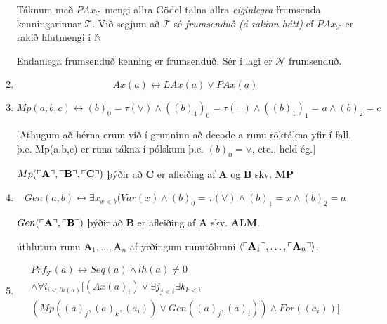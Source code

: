 \documentclass[12pt]{book}
\newcommand{\cT}{\mathcal{T}}
\newcommand{\cN}{\mathcal{N}}
\newcommand{\bA}{\mathbf{A}}
\newcommand{\bB}{\mathbf{B}}
\newcommand{\bC}{\mathbf{C}}
\DeclarePairedDelimiter{\god}{\ulcorner}{\urcorner}
\begin{document}
\begin{enumerate}[(1)]
\begin{ath}
\end{ath}



\begin{skgr}
  Táknum með $PAx_{\cT}$ mengi allra Gödel-talna allra
  \emph{eiginlegra} frumsenda kenningarinnar $\cT$.
  Við segjum að $\cT$ sé \emph{frumsenduð (á rakinn hátt)}
  ef $PAx_{\cT}$ er rakið hlutmengi í $\mathbb{N}$
\end{skgr}

\begin{ath}
  Endanlega frumsenduð kenning er frumsenduð. Sér í 
  lagi er $\cN$ frumsenduð.
\end{ath}


\item 

\[Ax(a) \leftrightarrow LAx(a) \vee PAx(a) \]

\item 
\[Mp(a,b,c) \leftrightarrow (b)_0 = \tau(\vee) \wedge ((b)_1)_0 = \tau(\lnot) \wedge ((b)_1)_1 = a \wedge (b)_2 = c\]

[Athugum að hérna erum við í grunninn að decode-a runu röktákna
yfir í fall, þ.e. Mp(a,b,c) er runa tákna í pólskum þ.e.
$(b)_0 = \vee$, etc., held ég.]
\begin{ath}

$Mp(\god{\bA}, \god{\bB},\god{\bC})$ þýðir að $\bC$ er afleiðing af
$\bA$ og $\bB$ skv. \textbf{MP}

\end{ath}

\item 

\[Gen(a,b) \leftrightarrow \exists x_{x < b} (Var(x) \wedge (b)_0 = \tau(\forall) \wedge (b)_1 = x \wedge (b)_2 = a \]

\begin{ath}
  $Gen(\god{\bA},\god{\bB})$ þýðir að $\bB$ er afleiðing af $\bA$
skv. \textbf{ALM}.

úthlutum runu $\bA_1, \dotsc,\bA_n$ af yrðingum runutölunni
$\braket{\god{\bA_1}, \dotsc,\god{\bA_n}}$.

\end{ath}

\item 
  \begin{gather*}
    Prf_{\cT} (a) \leftrightarrow Seq(a) \wedge lh(a) \neq 0 \\
    \wedge \forall i_{i < lh(a)} [ (Ax(a)_i) \vee \exists j_{j < i} \exists k_{k < i}\\
    (Mp((a)_j,(a)_k,(a_i)) \vee Gen((a)_j,(a)_i)) \wedge For((a_i))]
  \end{gather*}


\end{enumerate}
\end{document}
